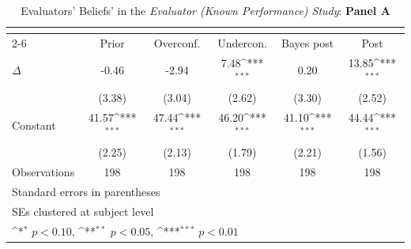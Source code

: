\begin{table}[htbp]\centering
\def\sym#1{\ifmmode^{#1}\else\(^{#1}\)\fi}
\caption{Evaluators' Beliefs' in the \textit{Evaluator (Known Performance) Study}: \textbf{Panel A}}
\begin{tabular}{l*{5}{c}}
\hline\hline
                &\multicolumn{5}{c}{}                                                                          \\\cmidrule(lr){2-6}
                &\multicolumn{1}{c}{Prior}&\multicolumn{1}{c}{Overconf.}&\multicolumn{1}{c}{Undercon.}&\multicolumn{1}{c}{Bayes post}&\multicolumn{1}{c}{Post}\\
\hline
$\Delta$        &    -0.46         &    -2.94         &     7.48\sym{***}&     0.20         &    13.85\sym{***}\\
                &   (3.38)         &   (3.04)         &   (2.62)         &   (3.30)         &   (2.52)         \\
Constant        &    41.57\sym{***}&    47.44\sym{***}&    46.20\sym{***}&    41.10\sym{***}&    44.44\sym{***}\\
                &   (2.25)         &   (2.13)         &   (1.79)         &   (2.21)         &   (1.56)         \\
\hline
Observations    &      198         &      198         &      198         &      198         &      198         \\
\hline\hline
\multicolumn{6}{l}{\footnotesize Standard errors in parentheses}\\
\multicolumn{6}{l}{\footnotesize SEs clustered at subject level}\\
\multicolumn{6}{l}{\footnotesize \sym{*} \(p<0.10\), \sym{**} \(p<0.05\), \sym{***} \(p<0.01\)}\\
\end{tabular}
\end{table}
